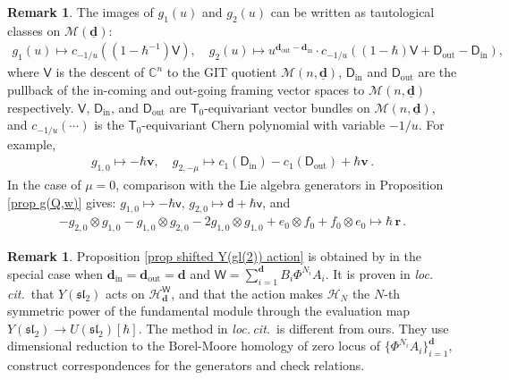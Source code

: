 \documentclass[10pt]{amsart}
\theoremstyle{definition}
\newtheorem{Remark}[Theorem]{Remark}
\numberwithin{equation}{section}
\newcommand{\bC}{\mathbb{C}}
\newcommand{\bv}{\mathbf{v}}
\newcommand{\bd}{\mathbf{d}}
\newcommand{\cH}{\mathcal{H}}
\newcommand{\cM}{\mathcal{M}}
\newcommand{\sT}{\mathsf{T}}
\newcommand{\sW}{\mathsf{W}}
\newcommand{\sw}{\mathsf{w}}
\newcommand{\In}{\operatorname{in}}
\newcommand{\Out}{\operatorname{out}}
\begin{document}
\begin{Remark}
The images of $g_1(u)$ and $g_2(u)$ can be written as tautological classes on $\cM(\underline{\bd})$:
\begin{align*}
    g_1(u)\mapsto c_{-1/u}\left((1-\hbar^{-1})\mathsf V\right),\quad g_2(u)\mapsto u^{\bd_{\Out}-\bd_{\In}}\cdot c_{-1/u}\left((1-\hbar)\mathsf V+\mathsf D_{\Out}-\mathsf D_{\In}\right),
\end{align*}
where $\mathsf V$ is the descent of $\bC^n$ to the GIT quotient $\cM(n,\underline{\bd})$, $\mathsf D_{\In}$ and $\mathsf D_{\Out}$ are the pullback of the in-coming and out-going framing vector spaces to $\cM(n,\underline{\bd})$ respectively. $\mathsf V$, $\mathsf D_{\In}$, and $\mathsf D_{\Out}$ are $\sT_0$-equivariant vector bundles on $\cM(n,\underline{\bd})$, and $c_{-1/u}(\cdots)$ is the $\sT_0$-equivariant Chern polynomial with variable $-1/u$. For example,
\begin{align*}
    g_{1,0}\mapsto  -\hbar\bv,\quad g_{2,-\mu} \mapsto c_1(\mathsf D_{\In})-c_1(\mathsf D_{\Out})+\hbar\bv\,.
\end{align*}
In the case of $\mu=0$, comparison with the Lie algebra generators in Proposition \ref{prop g(Q,w)} gives:
$g_{1,0}\mapsto -\hbar\mathsf v$, $g_{2,0}\mapsto \mathsf d+\hbar\mathsf v$, and
\begin{align}\label{r-mat gl2}
-g_{2,0}\otimes g_{1,0}-g_{1,0}\otimes g_{2,0}-2g_{1,0}\otimes g_{1,0}+e_0\otimes f_0+f_0\otimes e_0\mapsto \hbar\,\pmb r\,.
\end{align}
\end{Remark}



\begin{Remark}
Proposition \ref{prop shifted Y(gl(2)) action} is obtained by \cite{YZJ} in the special case when 
$\bd_{\In}=\bd_{\Out}=\bd$ and $\sW=\sum_{i=1}^{\bd}B_i\Phi^{N_i}A_i$.
It is proven in \textit{loc.\,cit.}~that $Y(\mathfrak{sl}_2)$ acts on $\cH^{\sW}_{{\bd}}$, and that the action makes $\cH_N$ the $N$-th symmetric power of the fundamental module through the evaluation map $Y(\mathfrak{sl}_2)\to U(\mathfrak{sl}_2)[\hbar]$. The method in \textit{loc.\,cit.}~is different from ours. They use dimensional reduction to the Borel-Moore homology of zero locus of $\{\Phi^{N_i}A_i\}_{i=1}^{\bd}$, construct correspondences for the generators and check relations. 
\end{Remark}
\end{document}

